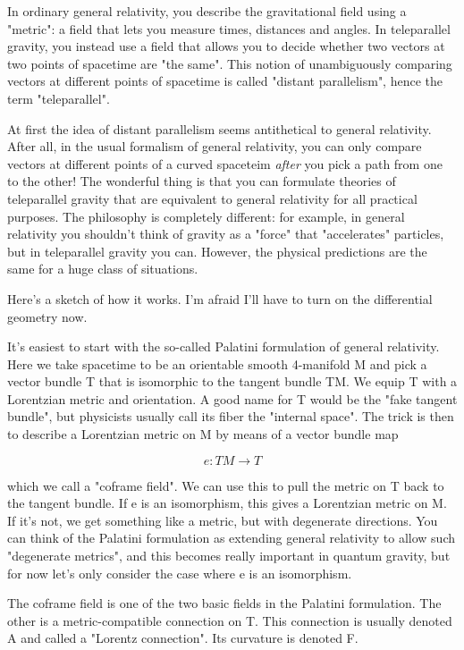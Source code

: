 In ordinary general relativity, you describe the gravitational field
using a "metric": a field that lets you measure times, distances and
angles.  In teleparallel gravity, you instead use a field that allows
you to decide whether two vectors at two points of spacetime are "the
same".   This notion of unambiguously comparing vectors at different
points of spacetime is called "distant parallelism", hence the term
"teleparallel".  

At first the idea of distant parallelism seems antithetical to general
relativity.  After all, in the usual formalism of general relativity,
you can only compare vectors at different points of a curved spaceteim
\emph{after} you pick a path from one to the other!  The wonderful thing is
that you can formulate theories of teleparallel gravity that are
equivalent to general relativity for all practical purposes.  The
philosophy is completely different: for example, in general relativity
you shouldn't think of gravity as a "force" that "accelerates"
particles, but in teleparallel gravity you can.  However, the physical
predictions are the same for a huge class of situations.

Here's a sketch of how it works.  I'm afraid I'll have to turn on the
differential geometry now.

It's easiest to start with the so-called Palatini formulation of general
relativity.  Here we take spacetime to be an orientable smooth
4-manifold M and pick a vector bundle T that is isomorphic to the
tangent bundle TM.  We equip T with a Lorentzian metric and orientation.
A good name for T would be the "fake tangent bundle", but physicists
usually call its fiber the "internal space".  The trick is then to
describe a Lorentzian metric on M by means of a vector bundle map


$$

e: TM \to  T  
$$
    
which we call a "coframe field".  We can use this to pull the metric on
T back to the tangent bundle.  If e is an isomorphism, this gives a
Lorentzian metric on M.  If it's not, we get something like a metric,
but with degenerate directions.  You can think of the Palatini
formulation as extending general relativity to allow such "degenerate
metrics", and this becomes really important in quantum gravity, but for
now let's only consider the case where e is an isomorphism.

The coframe field is one of the two basic fields in the Palatini
formulation.  The other is a metric-compatible connection on T.  
This connection is usually denoted A and called a "Lorentz connection".  
Its curvature is denoted F.

